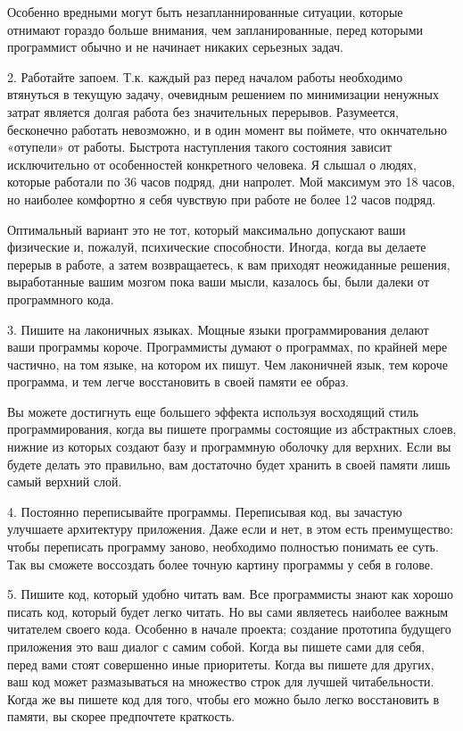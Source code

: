 \documentclass[ebook,12pt,oneside,openany]{memoir}
\begin{document}
Особенно вредными могут быть незапланнированные ситуации, которые
отнимают гораздо больше внимания, чем запланированные, перед которыми
программист обычно и не начинает никаких серьезных задач.

2. Работайте запоем. Т.к. каждый раз перед началом работы необходимо
втянуться в текущую задачу, очевидным решением по минимизации ненужных
затрат является долгая работа без значительных перерывов. Разумеется,
бесконечно работать невозможно, и в один момент вы поймете, что
окнчательно «отупели» от работы. Быстрота наступления такого состояния
зависит исключительно от особенностей конкретного человека. Я слышал о
людях, которые работали по 36 часов подряд, дни напролет. Мой максимум
это 18 часов, но наиболее комфортно я себя чувствую при работе не
более 12 часов подряд.

Оптимальный вариант это не тот, который максимально допускают ваши
физические и, пожалуй, психические способности. Иногда, когда вы
делаете перерыв в работе, а затем возвращаетесь, к вам приходят
неожиданные решения, выработанные вашим мозгом пока ваши мысли,
казалось бы, были далеки от программного кода.

3. Пишите на лаконичных языках. Мощные языки программирования делают
ваши программы короче. Программисты думают о программах, по крайней
мере частично, на том языке, на котором их пишут. Чем лаконичней язык,
тем короче программа, и тем легче восстановить в своей памяти ее
образ.

Вы можете достигнуть еще большего эффекта используя восходящий стиль
программирования, когда вы пишете программы состоящие из абстрактных
слоев, нижние из которых создают базу и программную оболочку для
верхних. Если вы будете делать это правильно, вам достаточно будет
хранить в своей памяти лишь самый верхний слой.

4. Постоянно переписывайте программы. Переписывая код, вы зачастую
улучшаете архитектуру приложения. Даже если и нет, в этом есть
преимущество: чтобы переписать программу заново, необходимо полностью
понимать ее суть. Так вы сможете воссоздать более точную картину
программы у себя в голове.

5. Пишите код, который удобно читать вам. Все программисты знают как
хорошо писать код, который будет легко читать. Но вы сами являетесь
наиболее важным читателем своего кода. Особенно в начале проекта;
создание прототипа будущего приложения это ваш диалог с самим собой.
Когда вы пишете сами для себя, перед вами стоят совершенно иные
приоритеты. Когда вы пишете для других, ваш код может размазываться на
множество строк для лучшей читабельности. Когда же вы пишете код для
того, чтобы его можно было легко восстановить в памяти, вы скорее
предпочтете краткость.
\end{document}
